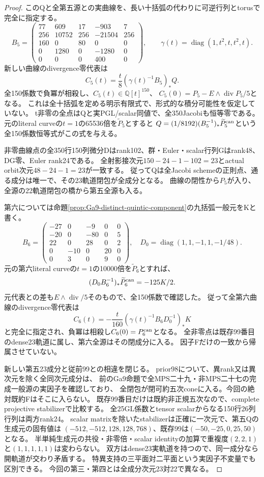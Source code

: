\documentclass[a4paper,11pt]{ltjsarticle}
\theoremstyle{definition}
\begin{document}
\begin{proof}
このQと全第五源との実曲線を、長い十括弧の代わりに可逆行列とtorusで完全に指定する。
\[
 B_5=\begin{pmatrix}
 77&609&17&-903&7\\256&10752&256&-21504&256\\160&0&80&0&0\\
 0&1280&0&-1280&0\\0&0&0&400&0
 \end{pmatrix},\qquad
 \gamma(t)=\operatorname{diag}(1,t^2,t,t^2,t).
\]
新しい曲線のdivergence零代表は
\[
 C_5(t)=\frac t8(\gamma(t)^{-1}B_5)_*Q.
\]
全150係数で負冪が相殺し、$C_5(t)\in\mathbb Q[t]^{150}$、
$C_5(0)=P_5-E\wedge\operatorname{div}P_5/5$となる。
これは全十括弧を定める明示有限式で、形式的な積分可能性を仮定していない。
t非零の全点はQと実PGL/scalar同値で、全350Jacobiも恒等零である。
元のliteral curveの$t=1$の65536倍を$\widetilde P_5$とすると
$Q=(1/8192)(B_5^{-1})_*\widetilde P_5^{\rm can}$という全150係数恒等式がこの式を与える。

非零曲線点の全350行150列微分Dはrank102、群・Euler・scalar行列Gはrank48、DG零、Euler rank24である。
全射影接次元$150-24-1-102=23$とactual orbit次元$48-24-1=23$が一致する。
従ってQは全Jacobi schemeの正則点、通る成分は唯一で、その23軌道閉包が全成分となる。
曲線の閉性から$P_5$が入り、全源の22軌道閉包の橋から第五全源も入る。

第六については命題\ref{prop:Ga9-distinct-quintic-component}の九括弧一般元をKと書く。
\[
 B_6=\begin{pmatrix}
 -27&0&-9&0&0\\-20&0&-80&0&5\\22&0&28&0&2\\
 0&-10&0&20&0\\0&3&0&9&0
 \end{pmatrix},\quad D_0=\operatorname{diag}(1,1,-1,1,-1/48).
\]
元の第六literal curveの$t=1$の10000倍を$\widetilde P_6$とすれば、
\[
 (D_0B_6^{-1})_*\widetilde P_6^{\rm can}=-125K/2.
\]
元代表との差も$E\wedge\operatorname{div}/5$そのもので、全150係数で確認した。
従って全第六曲線のdivergence零代表は
\[
 C_6(t)=-\frac t{160}(\gamma(t)^{-1}B_6D_0^{-1})_*K
\]
と完全に指定され、負冪は相殺し$C_6(0)=P_6^{\rm can}$となる。
全非零点は既存99番目のdense23軌道に属し、第六全源はその閉成分に入る。
因子Fだけの一致から帰属させていない。

新しい第五23成分と従前99との相違を閉じる。
prior98について、異rank又は異次元を除く全同次元成分は、
前のGa9命題で全MPS二十九・非MPS二十七の完成一般源の実因子を確認しており、
全閉包が閉可約五次coneに入る。今回の絶対既約Fはそこに入らない。
既存99番目だけは既約非正規五次なので、complete projective stabilizerで比較する。
全25GL係数とtensor scalarからなる150行26列行列は両方rank24。
scalar matrixを除いたstabilizerは正確に一次元で、第五Qの生成元の固有値は
$(-512,-512,128,128,768)$、既存99は$(-50,-25,0,25,50)$となる。
半単純生成元の共役・非零倍・scalar identityの加算で重複度$(2,2,1)$と$(1,1,1,1,1)$は変わらない。
双方はdense23実軌道を持つので、同一成分なら開軌道が交わり矛盾する。
特異支持の三平面対二平面という実因子不変量でも区別できる。
今回の第三・第四とは全成分次元23対22で異なる。
\end{proof}
\end{document}
